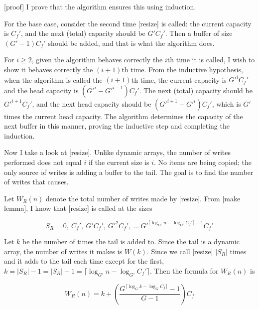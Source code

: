 \documentclass{article}
\newcommand{\nwritesfn}{W}
\newcommand{\nwritesresizefn}{W_R}
\newcommand{\varnitems}{n}
\newcommand{\initcapacity}{C_f}
\newcommand{\growthfactor}{G}
\newcommand{\initcapacitynew}{\initcapacity'}
\newcommand{\growthfactornew}{\growthfactor'}
\begin{document}
	[proof]
	I prove that the algorithm ensures this using induction.
	
	For the base case, consider the second time [resize] is called: the current capacity is $\initcapacitynew$, and the next (total) capacity should be $\growthfactornew\initcapacitynew$. Then a buffer of size $(\growthfactornew - 1)\initcapacitynew$ should be added, and that is what the algorithm does.
	
	For $i \geq 2$, given the algorithm behaves correctly the $i$th time it is called, I wish to show it behaves correctly the $(i + 1)$th time. From the inductive hypothesis, when the algorithm is called the $(i + 1)$th time, the current capacity is $\growthfactornew^i\initcapacitynew$ and the head capacity is $(\growthfactornew^i - \growthfactornew^{i - 1})\initcapacitynew$. The next (total) capacity should be $\growthfactornew^{i + 1}\initcapacitynew$, and the next head capacity should be $(\growthfactornew^{i + 1} - \growthfactornew^i)\initcapacitynew$, which is $\growthfactornew$ times the current head capacity. The algorithm determines the capacity of the next buffer in this manner, proving the inductive step and completing the induction.
	
	Now I take a look at [resize]. Unlike dynamic arrays, the number of writes performed does not equal $i$ if the current size is $i$. No items are being copied; the only source of writes is adding a buffer to the tail. The goal is to find the number of writes that causes.
	
	Let $\nwritesresizefn(n)$ denote the total number of writes made by [resize]. From [make lemma], I know that [resize] is called at the sizes
	
	$$
	S_R = 0,\ \initcapacitynew,\ \growthfactornew\initcapacitynew,\ \growthfactornew^2\initcapacitynew,\ \ldots\ \growthfactornew^{\lceil \log_{\growthfactornew} \varnitems - \log_{\growthfactornew} \initcapacitynew \rceil - 1}\initcapacitynew
	$$
	
	Let $k$ be the number of times the tail is added to. Since the tail is a dynamic array, the number of writes it makes is $\nwritesfn(k)$. Since we call [resize] $|S_R|$ times and it adds to the tail each time except for the first, $k = |S_R| - 1 = |S_R| - 1 = \lceil \log_{\growthfactornew} \varnitems - \log_{\growthfactornew} \initcapacitynew \rceil$. Then the formula for $\nwritesresizefn(n)$ is
	
	$$
	\nwritesresizefn(n) = k + \left( \frac{\growthfactor^{\lceil \log_{\growthfactor} k - \log_{\growthfactor} \initcapacity \rceil} - 1}{\growthfactor - 1} \right) \initcapacity
	$$
	
\end{document}
